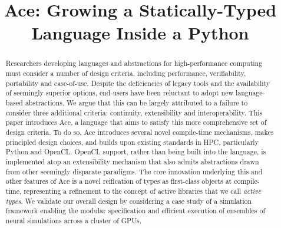 \documentclass[9pt,preprint]{sigplanconf}
\begin{document}
\conferenceinfo{-}{-} 
\copyrightyear{-} 
\copyrightdata{[to be supplied]} 


\newcommand{\Ace}{\textsf{Ace}}

\title{\Ace: Growing a Statically-Typed Language Inside a Python}

\authorinfo{~}{~}{~}

\maketitle
\begin{abstract}
Researchers developing languages and abstractions for high-performance computing must consider a number of design criteria, including performance, verifiability, portability and ease-of-use. Despite the deficiencies of legacy tools and the availability of seemingly superior options, end-users have been reluctant to adopt new language-based abstractions. We argue that this can be largely attributed to a failure to consider three additional criteria: continuity, extensibility\- and interoperability. This paper introduces Ace, a language that aims to satisfy this more comprehensive set of design criteria. To do so, Ace introduces several novel compile-time mechanisms, makes principled design choices, and builds upon existing standards in HPC, particularly Python and OpenCL. OpenCL support, rather than being built into the language, is implemented atop an extensibility mechanism that also admits abstractions drawn from other seemingly disparate paradigms. The core innovation underlying this and other features of Ace is a novel reification of types as first-class objects at compile-time, representing a refinement to the concept of active libraries that we call \emph{active types}. We validate our overall design by considering a case study of a simulation framework enabling the modular specification and efficient execution of ensembles of neural simulations across a cluster of GPUs.
\end{abstract}

\end{document}
